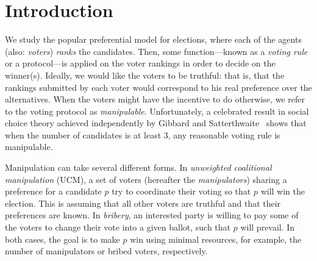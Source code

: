 \documentclass[letterpaper]{article} %
\theoremstyle{definition}
\begin{document}
\section{Introduction}
We study the popular preferential model for elections, where each of the agents (also:  \emph{voters})  \emph{ranks} the candidates. Then, some function---known as a \emph{voting rule} or a protocol---is applied on the voter rankings in order to decide on the winner(s). Ideally, we would like the voters to be truthful: that is, that the rankings submitted by each voter would correspond to his real preference over the alternatives. When the voters might have the incentive to do otherwise, we refer to the voting protocol as \emph{manipulable}. Unfortunately, a celebrated result in social choice theory achieved independently by Gibbard and Satterthwaite~\cite{gibbard1973manipulation,satterthwaite1975strategy} shows that when the number of candidates is at least $3$, any reasonable voting rule  is manipulable.

Manipulation can take several different forms. In \emph{unweighted  coalitional manipulation} (UCM), a set of voters (hereafter the \emph{manipulators}) sharing a preference for a candidate $p$  try to coordinate their voting so that $p$ will win the election. This is assuming that all other voters are truthful and that their preferences are known.
In \emph{bribery}, an interested party is willing to pay some of the voters to change their vote into a given ballot, such that $p$ will prevail.
In both cases, the goal is to make $p$ win using minimal resources, for example, the number of manipulators or bribed voters, respectively.
\end{document}
